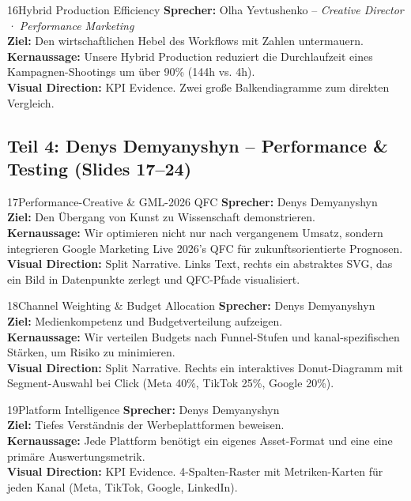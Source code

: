 \documentclass[11pt,a4paper]{article}
\begin{document}
\begin{slidebox}{16}{Hybrid Production Efficiency}
    \textbf{Sprecher:} Olha Yevtushenko -- \textit{Creative Director · Performance Marketing} \\
    \textbf{Ziel:} Den wirtschaftlichen Hebel des Workflows mit Zahlen untermauern.\\
    \textbf{Kernaussage:} Unsere Hybrid Production reduziert die Durchlaufzeit eines Kampagnen-Shootings um über 90\% (144h vs. 4h).\\
    \textbf{Visual Direction:} KPI Evidence. Zwei große Balkendiagramme zum direkten Vergleich.
\end{slidebox}

\newpage
\subsection{Teil 4: Denys Demyanyshyn -- Performance & Testing (Slides 17--24)}

\begin{slidebox}{17}{Performance-Creative \& GML-2026 QFC}
    \textbf{Sprecher:} Denys Demyanyshyn \\
    \textbf{Ziel:} Den Übergang von Kunst zu Wissenschaft demonstrieren.\\
    \textbf{Kernaussage:} Wir optimieren nicht nur nach vergangenem Umsatz, sondern integrieren Google Marketing Live 2026's QFC für zukunftsorientierte Prognosen.\\
    \textbf{Visual Direction:} Split Narrative. Links Text, rechts ein abstraktes SVG, das ein Bild in Datenpunkte zerlegt und QFC-Pfade visualisiert.
\end{slidebox}

\begin{slidebox}{18}{Channel Weighting \& Budget Allocation}
    \textbf{Sprecher:} Denys Demyanyshyn \\
    \textbf{Ziel:} Medienkompetenz und Budgetverteilung aufzeigen.\\
    \textbf{Kernaussage:} Wir verteilen Budgets nach Funnel-Stufen und kanal-spezifischen Stärken, um Risiko zu minimieren.\\
    \textbf{Visual Direction:} Split Narrative. Rechts ein interaktives Donut-Diagramm mit Segment-Auswahl bei Click (Meta 40\%, TikTok 25\%, Google 20\%).
\end{slidebox}

\begin{slidebox}{19}{Platform Intelligence}
    \textbf{Sprecher:} Denys Demyanyshyn \\
    \textbf{Ziel:} Tiefes Verständnis der Werbeplattformen beweisen.\\
    \textbf{Kernaussage:} Jede Plattform benötigt ein eigenes Asset-Format und eine eine primäre Auswertungsmetrik.\\
    \textbf{Visual Direction:} KPI Evidence. 4-Spalten-Raster mit Metriken-Karten für jeden Kanal (Meta, TikTok, Google, LinkedIn).
\end{slidebox}
\end{document}
